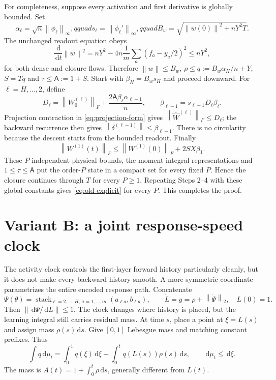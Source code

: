 \documentclass[11pt]{article}
\theoremstyle{definition}
\theoremstyle{remark}
\newcommand{\norm}[1]{\left\lVert #1\right\rVert}
\newcommand{\dd}{\,\mathrm{d}}
\begin{document}
For completeness, suppose every activation and first derivative is globally
bounded.  Set
\[
 \alpha_\ell=\sqrt n\norm{\phi_\ell}_\infty,qquad
 s_\ell=\norm{\phi_\ell'}_\infty,qquad
 B_w=\sqrt{\norm{w(0)}^2+nY^2T}.
\]
The unchanged readout equation obeys
\[
 \frac{\dd}{\dd t}\norm w^2
 =nY^2-4n\frac1m\sum_a(f_a-y_a/2)^2\le nY^2,
\]
for both dense and closure flows.  Therefore
$\norm w\le B_w$, $\rho\le q:=B_w\alpha_H/n+Y$,
$S=Tq$ and $\tau\le\mathsf A:=1+S$.  Start with
$\beta_H=B_ws_H$ and proceed downward.  For $\ell=H,\ldots,2$, define
\[
 D_\ell=\norm{W_0^{(\ell)}}_F+
 \frac{2\mathsf A\beta_\ell\alpha_{\ell-1}}{n},
 \qquad \beta_{\ell-1}=s_{\ell-1}D_\ell\beta_\ell.
\]
Projection contraction in \eqref{eq:projection-form} gives
$\norm{\widehat W^{(\ell)}}_F\le D_\ell$; the backward recurrence then gives
$\norm{\delta^{(\ell-1)}}\le\beta_{\ell-1}$.  There is no circularity because
the descent starts from the bounded readout.  Finally
\[
 \norm{W^{(1)}(t)}_F\le\norm{W^{(1)}(0)}_F+2SX\beta_1.
\]
These $P$-independent physical bounds, the moment integral representations and
$1\le\tau\le\mathsf A$ put the order-$P$ state in a compact set for every
fixed $P$.  Hence the closure continues through $T$ for every $P\ge1$.
Repeating Steps 2--4 with these global constants gives
\eqref{eq:old-explicit} for every $P$.  This completes the proof.

\section{Variant B: a joint response-speed clock}
\label{sec:new-clock}

The activity clock controls the first-layer forward history particularly
cleanly, but it does not make every backward history smooth.  A more symmetric
coordinate parametrizes the entire encoded response path.  Concatenate
\begin{equation}
 \Psi(\theta)=\operatorname{stack}_{\ell=2,\ldots,H;\,a=1,\ldots,m}
 (a_{\ell a},b_{\ell a}),\qquad
 \dot L=g=\rho+\norm{\dot\Psi}_2,\quad L(0)=1.        \label{eq:new-clock}
\end{equation}
Then $\norm{\dd\Psi/\dd L}\le1$.  The clock changes where history is placed,
but the learning integral still carries residual mass.  At time $s$, place a
point at $\xi=L(s)$ and assign mass $\rho(s)\dd s$.  Give $[0,1]$ Lebesgue
mass and matching constant prefixes.  Thus
\[
 \int q\dd\mu_t=\int_0^1q(\xi)\dd\xi+
 \int_0^tq(L(s))\rho(s)\dd s,\qquad \dd\mu_t\le\dd\xi.
\]
The mass is $A(t)=1+\int_0^t\rho\dd s$, generally different from $L(t)$.
\end{document}
